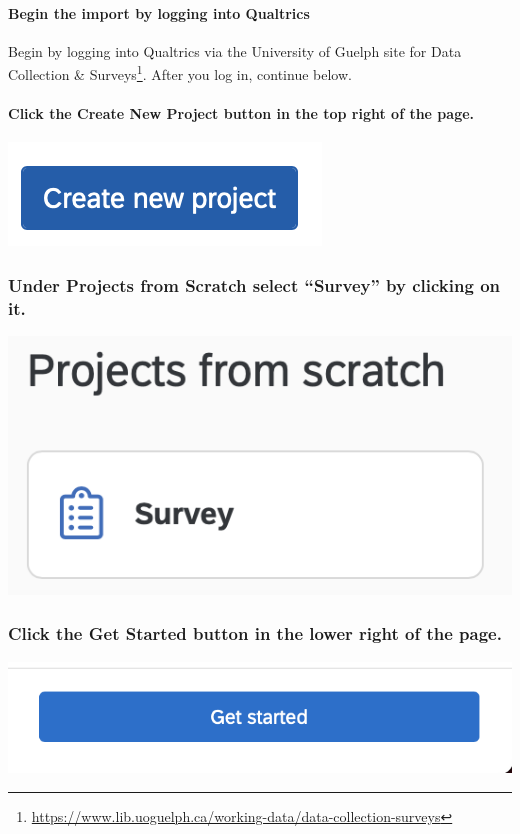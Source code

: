 \documentclass[
]{krantz}
\renewcommand{\href}[2]{#2\footnote{\url{#1}}}
\begin{document}
\hypertarget{begin-the-import-by-logging-into-qualtrics}{%
\paragraph{Begin the import by logging into Qualtrics}\label{begin-the-import-by-logging-into-qualtrics}}

Begin by logging into Qualtrics via the University of Guelph site for \href{https://www.lib.uoguelph.ca/working-data/data-collection-surveys}{Data Collection \& Surveys}. After you log in, continue below.

\hypertarget{click-the-create-new-project-button-in-the-top-right-of-the-page.}{%
\paragraph{Click the Create New Project button in the top right of the page.}\label{click-the-create-new-project-button-in-the-top-right-of-the-page.}}

\includegraphics[width=0.2\linewidth]{ch_qualtrics/images/screenshot_b1}

\hypertarget{under-projects-from-scratch-select-survey-by-clicking-on-it.}{%
\subsubsection{Under Projects from Scratch select ``Survey'' by clicking on it.}\label{under-projects-from-scratch-select-survey-by-clicking-on-it.}}

\includegraphics[width=0.3\linewidth]{ch_qualtrics/images/screenshot_b2}

\hypertarget{click-the-get-started-button-in-the-lower-right-of-the-page.}{%
\subsubsection{Click the Get Started button in the lower right of the page.}\label{click-the-get-started-button-in-the-lower-right-of-the-page.}}

\includegraphics[width=0.4\linewidth]{ch_qualtrics/images/screenshot_b3}
\end{document}
